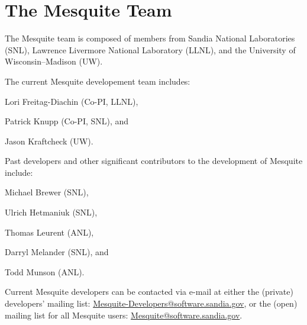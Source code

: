 \chapter{The Mesquite Team}

The Mesquite team is composed of members from Sandia
National Laboratories (SNL), Lawrence Livermore National Laboratory (LLNL), 
and the University of Wisconsin--Madison (UW).\newline
 
\noindent The current Mesquite developement team includes: \newline

Lori Freitag-Diachin (Co-PI, LLNL), \newline

Patrick Knupp (Co-PI, SNL), and \newline

Jason Kraftcheck (UW).  \newline

\noindent Past developers and other significant contributors to
the development of Mesquite include:\newline

Michael Brewer (SNL), \newline

Ulrich Hetmaniuk (SNL), \newline

Thomas Leurent (ANL), \newline

Darryl Melander (SNL), and \newline

Todd Munson (ANL).  \newline

\noindent Current Mesquite developers can be contacted via e-mail at either 
the (private) developers' mailing list: 
\href{mailto:mesquite-developers@software.sandia.gov}
{Mesquite-Developers@software.sandia.gov},
or the (open) mailing list for all Mesquite users: 
\href{mailto:mesquite@software.sandia.gov}{Mesquite@software.sandia.gov}.
